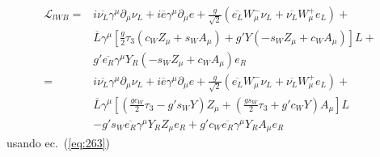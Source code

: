 \begin{align}
  \mathcal{L}_{l W B}=&i\overline{\nu_L}\gamma^\mu\partial_\mu\nu_L+i\overline{e}\gamma^\mu\partial_\mu e
+\frac{g}{\sqrt{2}}\left(\overline{e_L}W_\mu^-\nu_L+\overline{\nu_L}W_\mu^+e_L\right)+\nonumber\\
&\overline{L}\gamma^\mu\left[\frac{g}{2}\tau_3(c_W Z_\mu+s_W A_\mu)
+g'Y(-s_W Z_\mu+c_W A_\mu)\right]L+\nonumber\\
&g'\overline{e_R}\gamma^\mu Y_R(-s_W Z_\mu+c_W A_\mu) e_R\nonumber\\
=&i\overline{\nu_L}\gamma^\mu\partial_\mu\nu_L+i\overline{e}\gamma^\mu\partial_\mu e
+\frac{g}{\sqrt{2}}\left(\overline{e_L}W_\mu^-\nu_L+\overline{\nu_L}W_\mu^+e_L\right)+\nonumber\\
&\overline{L}\gamma^\mu\left[\left(\frac{g c_W}{2}\tau_3 -g's_W Y \right)Z_\mu
+\left(\frac{g s_W}{2}\tau_3 +g'c_W Y \right)A_\mu\right]L\nonumber\\
&-g's_W\overline{e_R}\gamma^\mu Y_R Z_\mu e_R+g'c_W\overline{e_R}\gamma^\mu Y_R A_\mu e_R
\end{align}
usando ec.~(\ref{eq:263})

